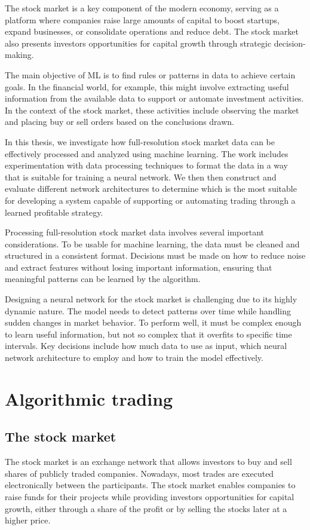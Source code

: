 \documentclass[a4paper,oneside,onecolumn,12pt]{book}
\begin{document}
The stock market is a key component of the modern economy, serving as a platform where companies raise large amounts of capital to boost startups, expand businesses, or consolidate operations and reduce debt.\cite{WSMandHDIW} The stock market also presents investors opportunities for capital growth through strategic decision-making. 

The main objective of ML is to find rules or patterns in data to achieve certain goals. In the financial world, for example, this might involve extracting useful information from the available data to support or automate investment activities. In the context of the stock market, these activities include observing the market and placing buy or sell orders based on the conclusions drawn. \cite{MLAT}

In this thesis, we investigate how full-resolution stock market data can be effectively processed and analyzed using machine learning. The work includes experimentation with data processing techniques to format the data in a way that is suitable for training a neural network. We then then construct and evaluate different network architectures to determine which is the most suitable for developing a system capable of supporting or automating trading through a learned profitable strategy.

Processing full-resolution stock market data involves several important considerations. To be usable for machine learning, the data must be cleaned and structured in a consistent format. Decisions must be made on how to reduce noise and extract features without losing important information, ensuring that meaningful patterns can be learned by the algorithm.

Designing a neural network for the stock market is challenging due to its highly dynamic nature. The model needs to detect patterns over time while handling sudden changes in market behavior. To perform well, it must be complex enough to learn useful information, but not so complex that it overfits to specific time intervals. Key decisions include how much data to use as input, which neural network architecture to employ and how to train the model effectively.

\chapter{Algorithmic trading}
\section{The stock market}
The stock market is an exchange network that allows investors to buy and sell shares of publicly traded companies. Nowadays, most trades are executed electronically between the participants. The stock market enables companies to raise funds for their projects while providing investors opportunities for capital growth, either through a share of the profit or by selling the stocks later at a higher price. \cite{WSMandHDIW}
\end{document}
